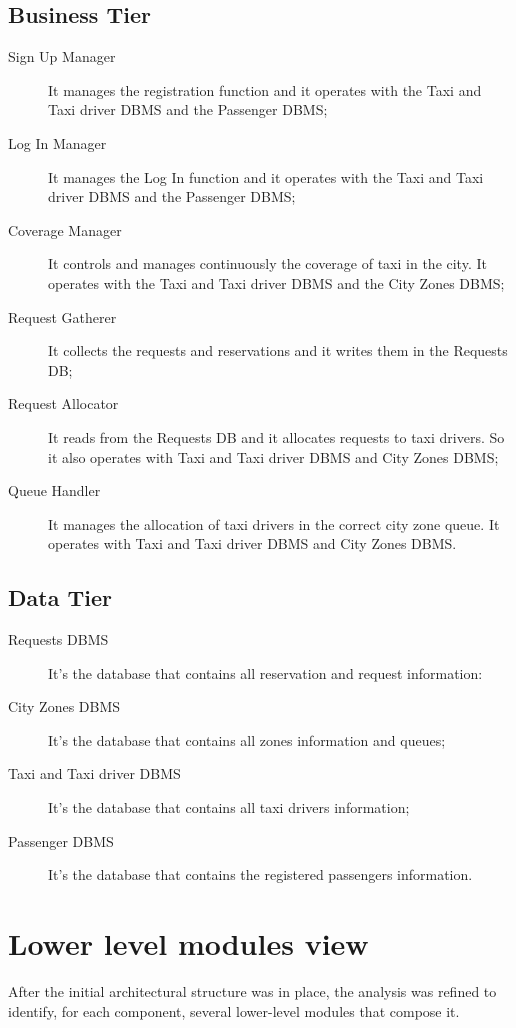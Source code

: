 \subsection{Business Tier}
\begin{description}
\item[Sign Up Manager] It manages the registration function and it operates with the Taxi and Taxi driver DBMS and the Passenger DBMS;
\item[Log In Manager] It manages the Log In function and it operates with the Taxi and Taxi driver DBMS and the Passenger DBMS;
\item[Coverage Manager] It controls and manages continuously the coverage of taxi in the city. It operates with  the Taxi and Taxi driver DBMS and the City Zones DBMS;
\item[Request Gatherer] It collects the requests and reservations and it writes them in the Requests DB;
\item[Request Allocator] It reads from the Requests DB and it allocates requests to taxi drivers. So it also operates with Taxi and Taxi driver DBMS and City Zones DBMS;
\item[Queue Handler] It manages the allocation of taxi drivers in the correct city zone queue. It operates with Taxi and Taxi driver DBMS and City Zones DBMS.
\end{description}

\subsection{Data Tier}
\begin{description}
\item[Requests DBMS] It's the database that contains all reservation and request information:
\item[City Zones DBMS] It's the database that contains all zones information and queues;
\item[Taxi and Taxi driver DBMS] It's the database that contains all taxi drivers information;
\item[Passenger DBMS] It's the database that contains the registered passengers information.
\end{description}


\section{Lower level modules view}
After the initial architectural structure was in place, the analysis was refined to identify, for each component, several lower-level modules that compose it.

